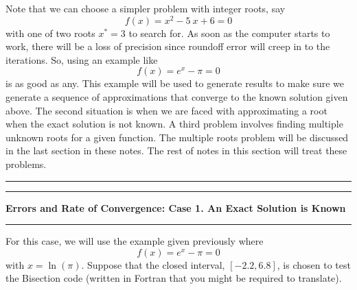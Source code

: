 \documentclass[10pt,fleqn]{article}
\begin{document}
Note that we can choose a simpler problem with integer roots, say
$$
  f(x) = x^2 - 5\ x + 6 = 0
$$
with one of two roots $x^*=3$ to search for. As soon as the computer starts to
work, there will be a loss of precision since roundoff error will creep in to
the iterations. So, using an example like
$$
  f(x) = e^x - \pi = 0
$$
is as good as any. This example will be used to generate results to make sure
we generate a sequence of approximations that converge to the known solution
given above.
The second situation is when we are faced with approximating a root when the
exact solution is not known. A third problem involves finding multiple unknown
roots for a given function. The multiple roots problem will be discussed in the
last section in these notes. The rest of notes in this section will treat these
problems.
\vskip0.1in\hrule\vskip0.1in
\newpage
\vskip0.1in\hrule\vskip0.1in
\noindent
{\bf Errors and Rate of Convergence: Case 1. An Exact Solution is Known}
\vskip0.1in\hrule\vskip0.1in
\noindent
For this case, we will use the example given previously where
$$
  f(x) = e^x - \pi = 0
$$
with $x=\ln(\pi)$. Suppose that the closed interval, $[-2.2, 6.8]$, is chosen
to test the Bisection code (written in Fortran that you might be required to
translate).
\end{document}
